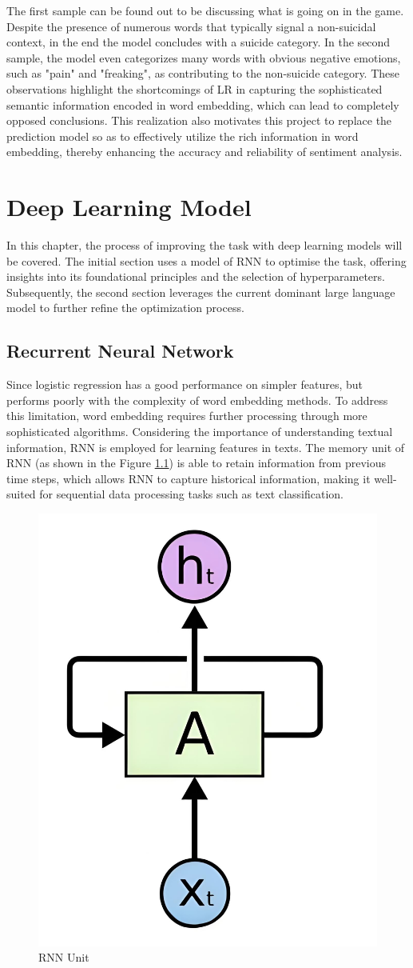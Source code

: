 \documentclass[ %
                    author={Bocheng Wang},
                supervisor={Dr. Qiang Liu},
                    degree={MSc},
                     title={A Research on Identification of Suicide Ideation in Texts with Multiple Models},
                      type={},
                      year={2024}]{dissertation}
\begin{document}
The first sample can be found out to be discussing what is going on in the game. Despite the presence of numerous words that typically signal a non-suicidal context, in the end the model concludes with a suicide category. In the second sample, the model even categorizes many words with obvious negative emotions, such as "pain" and "freaking", as contributing to the non-suicide category. These observations highlight the shortcomings of LR in capturing the sophisticated semantic information encoded in word embedding, which can lead to completely opposed conclusions. This realization also motivates this project to replace the prediction model so as to effectively utilize the rich information in word embedding, thereby enhancing the accuracy and reliability of sentiment analysis.


\chapter{Deep Learning Model}
\label{chap:execution2}
\noindent
In this chapter, the process of improving the task with deep learning models will be covered. The initial section uses a model of RNN to optimise the task, offering insights into its foundational principles and the selection of hyperparameters. Subsequently, the second section leverages the current dominant large language model to further refine the optimization process.

\section{Recurrent Neural Network}
\noindent
Since logistic regression has a good performance on simpler features, but performs poorly with the complexity of word embedding methods. To address this limitation, word embedding requires further processing through more sophisticated algorithms. Considering the importance of understanding textual information, RNN is employed for learning features in texts. The memory unit of RNN (as shown in the Figure \ref{fig:rnn}) is able to retain information from previous time steps, which allows RNN to capture historical information, making it well-suited for sequential data processing tasks such as text classification. 

\begin{figure}[h]
      \centering
      \includegraphics[width=0.2\linewidth]{../img/rnn.png}
      \caption{RNN Unit}
      \label{fig:rnn}
\end{figure}
\end{document}
